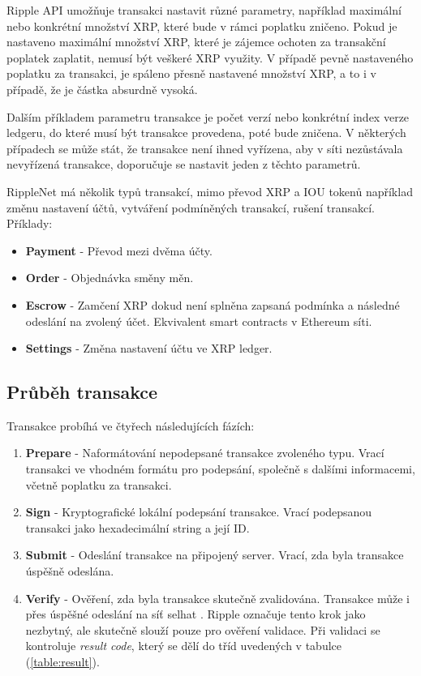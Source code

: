 \documentclass[hidelinks, titlepage]{article}
\begin{document}
Ripple API umožňuje transakci nastavit různé parametry, například maximální nebo konkrétní množství XRP, které bude v rámci poplatku zničeno. Pokud je nastaveno maximální množství XRP, které je zájemce ochoten za transakční poplatek zaplatit, nemusí být veškeré XRP využity. V případě pevně nastaveného poplatku za transakci, je spáleno přesně nastavené množství XRP, a to i v případě, že je částka absurdně vysoká. 

Dalším příkladem parametru transakce je počet verzí nebo konkrétní index verze ledgeru, do které musí být transakce provedena, poté bude zničena. V některých případech se může stát, že transakce není ihned vyřízena, aby v síti nezůstávala nevyřízená transakce, doporučuje se nastavit jeden z těchto parametrů.

RippleNet má několik typů transakcí, mimo převod XRP a IOU tokenů například změnu nastavení účtů, vytváření podmíněných transakcí, rušení transakcí. Příklady:
\begin{itemize}
\item \textbf{Payment} - Převod mezi dvěma účty.
\item \textbf{Order} - Objednávka směny měn.
\item \textbf{Escrow} - Zamčení XRP dokud není splněna zapsaná podmínka a následné odeslání na zvolený účet. Ekvivalent smart contracts v Ethereum síti.
\item \textbf{Settings} - Změna nastavení účtu ve XRP ledger.
\end{itemize}

\subsection{Průběh transakce}
Transakce probíhá ve čtyřech následujících fázích:
\begin{enumerate}
\item \textbf{Prepare} - Naformátování nepodepsané transakce zvoleného typu. Vrací transakci ve vhodném formátu pro podepsání, společně s dalšími informacemi, včetně poplatku za transakci.
\item \textbf{Sign} - Kryptografické lokální podepsání transakce. Vrací podepsanou transakci jako hexadecimální string a její ID. 
\item \textbf{Submit} - Odeslání transakce na připojený server. Vrací, zda byla transakce úspěšně odeslána.
\item \textbf{Verify} - Ověření, zda byla transakce skutečně zvalidována. Transakce může i přes úspěšné odeslání na síť selhat \cite{trans}. Ripple označuje tento krok jako nezbytný, ale skutečně slouží pouze pro ověření validace. Při validaci se kontroluje \textit{result code}, který se dělí do tříd uvedených v tabulce (\ref{table:result}).
\end{enumerate}
\end{document}
